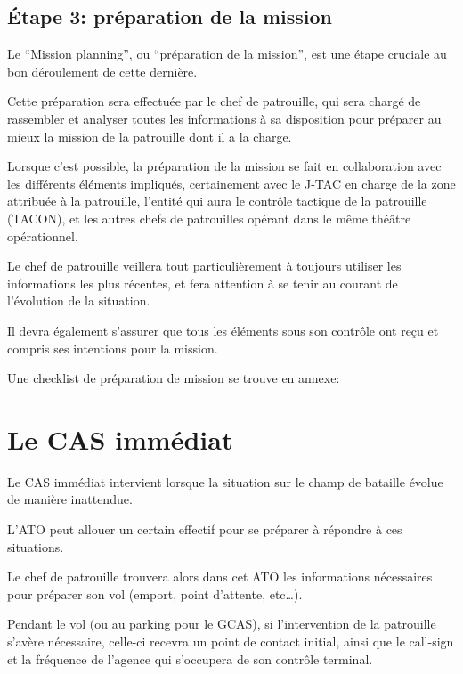 \subsection{Étape 3: préparation de la mission}

\begin{center}
\end{center}

\e
    \item Le “Mission planning”, ou “préparation de la mission”, est une étape cruciale au bon déroulement de cette dernière.
    \item Cette préparation sera effectuée par le chef de patrouille, qui sera chargé de rassembler et analyser toutes les informations à sa disposition pour préparer au mieux la mission de la patrouille dont il a la charge.
    \item Lorsque c’est possible, la préparation de la mission se fait en collaboration avec les différents éléments impliqués, certainement avec le J-TAC en charge de la zone attribuée à la patrouille, l’entité qui aura le contrôle tactique de la patrouille (TACON), et les autres chefs de patrouilles opérant dans le même théâtre opérationnel.
    \item Le chef de patrouille veillera tout particulièrement à toujours utiliser les informations les plus récentes, et fera attention à se tenir au courant de l’évolution de la situation.
    \item Il devra également s’assurer que tous les éléments sous son contrôle ont reçu et compris ses intentions pour la mission.
    \item Une checklist de préparation de mission se trouve en annexe: 
\ed

\section{Le CAS immédiat}

\e
    \item Le CAS immédiat intervient lorsque la situation sur le champ de bataille évolue de manière inattendue.
    \item L’ATO peut allouer un certain effectif pour se préparer à répondre à ces situations.
    \item Le chef de patrouille trouvera alors dans cet ATO les informations nécessaires pour préparer son vol (emport, point d’attente, etc…).
    \item
    Pendant le vol (ou au parking pour le GCAS), si l’intervention de la patrouille s’avère nécessaire, celle-ci recevra un point de contact initial, ainsi que le call-sign et la fréquence de l’agence qui s’occupera de son contrôle terminal.
\ed





